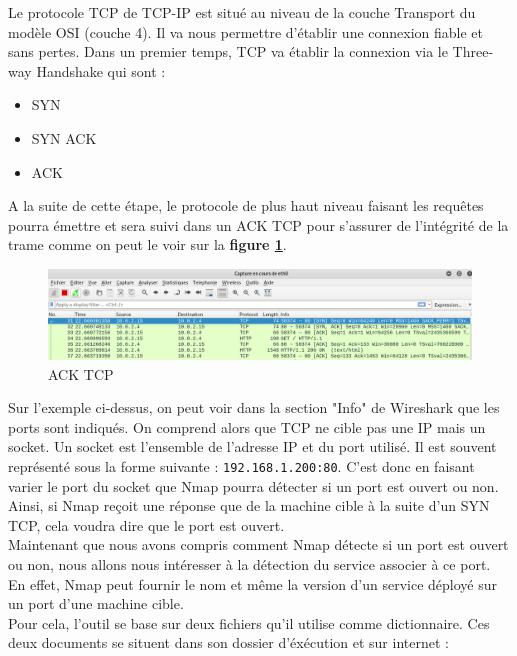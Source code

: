 Le protocole TCP de TCP-IP est situé au niveau de la couche Transport du modèle OSI (couche 4). Il va nous permettre d'établir une connexion fiable et sans pertes. Dans un premier temps, TCP va établir la connexion via le Three-way Handshake qui sont :

\begin{itemize}
    \item SYN
    \item SYN ACK
    \item ACK
\end{itemize}

A la suite de cette étape, le protocole de plus haut niveau faisant les requêtes pourra émettre et sera suivi dans un ACK TCP pour s'assurer de l'intégrité de la trame comme on peut le voir sur la \textbf{figure \ref{fig:acktcp}}.

\begin{figure}[htp!]
  \centering
  \setlength\figureheight{7cm}
  \setlength\figurewidth{9cm}
  \includegraphics[width=1\textwidth]{oui/Ancien/imangeancien/Nikto/wireshark1.PNG}
  \caption{ACK TCP}
  \label{fig:acktcp}
\end{figure}

Sur l'exemple ci-dessus, on peut voir dans la section "Info" de Wireshark que les ports sont indiqués. On comprend alors que TCP ne cible pas une IP mais un socket. Un socket est l'ensemble de l'adresse IP et du port utilisé. Il est souvent représenté sous la forme suivante : \verb+192.168.1.200:80+. C'est donc en faisant varier le port du socket que Nmap pourra détecter si un port est ouvert ou non. Ainsi, si Nmap reçoit une réponse que de la machine cible à la suite d'un SYN TCP, cela voudra dire que le port est ouvert.\\
Maintenant que nous avons compris comment Nmap détecte si un port est ouvert ou non, nous allons nous intéresser à la détection du service associer à ce port. En effet, Nmap peut fournir le nom et même la version d'un service déployé sur un port d'une machine cible.\\

\noindent Pour cela, l'outil se base sur deux fichiers qu'il utilise comme dictionnaire. Ces deux documents se situent dans son dossier d'éxécution et sur internet :

